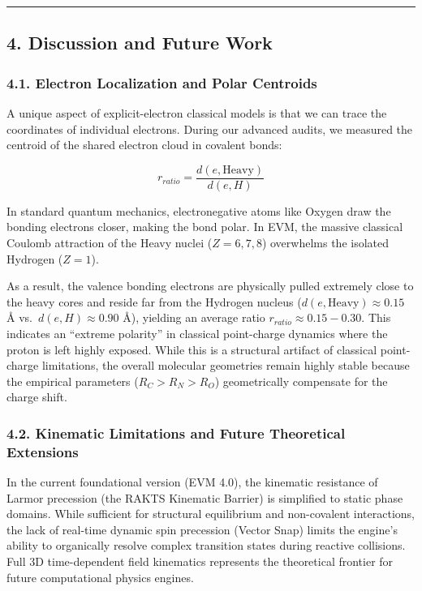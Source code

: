 \documentclass[
]{article}
\begin{document}
\begin{center}\rule{0.5\linewidth}{0.5pt}\end{center}

\subsection{4. Discussion and Future
Work}\label{discussion-and-future-work}

\subsubsection{4.1. Electron Localization and Polar
Centroids}\label{electron-localization-and-polar-centroids}

A unique aspect of explicit-electron classical models is that we can
trace the coordinates of individual electrons. During our advanced
audits, we measured the centroid of the shared electron cloud in
covalent bonds:

\[
r_{ratio} = \frac{d(e, \text{Heavy})}{d(e, H)}
\]

In standard quantum mechanics, electronegative atoms like Oxygen draw
the bonding electrons closer, making the bond polar. In EVM, the massive
classical Coulomb attraction of the Heavy nuclei (\(Z=6, 7, 8\))
overwhelms the isolated Hydrogen (\(Z=1\)).

As a result, the valence bonding electrons are physically pulled
extremely close to the heavy cores and reside far from the Hydrogen
nucleus (\(d(e, \text{Heavy}) \approx 0.15\) Å
vs.~\(d(e, H) \approx 0.90\) Å), yielding an average ratio
\(r_{ratio} \approx 0.15 - 0.30\). This indicates an ``extreme
polarity'' in classical point-charge dynamics where the proton is left
highly exposed. While this is a structural artifact of classical
point-charge limitations, the overall molecular geometries remain highly
stable because the empirical parameters (\(R_C > R_N > R_O\))
geometrically compensate for the charge shift.

\subsubsection{4.2. Kinematic Limitations and Future Theoretical
Extensions}\label{kinematic-limitations-and-future-theoretical-extensions}

In the current foundational version (EVM 4.0), the kinematic resistance
of Larmor precession (the RAKTS Kinematic Barrier) is simplified to
static phase domains. While sufficient for structural equilibrium and
non-covalent interactions, the lack of real-time dynamic spin precession
(Vector Snap) limits the engine's ability to organically resolve complex
transition states during reactive collisions. Full 3D time-dependent
field kinematics represents the theoretical frontier for future
computational physics engines.
\end{document}
